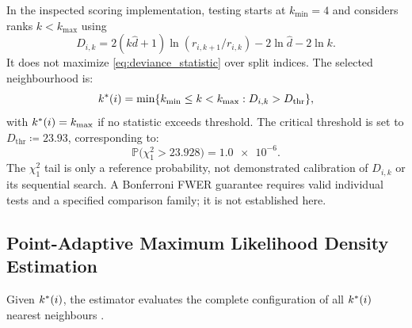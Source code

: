 \begin{definition}
  \label{def:kstar_stopping}
  In the inspected scoring implementation, testing starts at
  $k_{\min}=4$ and considers ranks $k<k_{\max}$ using
  \begin{equation}
    D_{i,k}=2(k\hat d+1)\ln(r_{i,k+1}/r_{i,k})
    -2\ln\hat d-2\ln k.
  \end{equation}
  It does not maximize \cref{eq:deviance_statistic} over split indices.
  The selected neighbourhood is:
  \begin{equation}
    k^{*}(i)=\min\{k_{\min}\le k<k_{\max}:D_{i,k}>D_{\mathrm{thr}}\},
    \label{eq:kstar_stopping_rule}
  \end{equation}
  with $k^{*}(i) = k_{\max}$ if no statistic exceeds threshold. The
  critical threshold is set to $D_{\mathrm{thr}} \coloneqq \num{23.93}$,
  corresponding to:
  \begin{equation}
    \mathbb{P}\bigl(\chi^2_1 > \num{23.928}\bigr) = \num{1.0e-6}.
    \label{eq:dthr_pvalue}
  \end{equation}
  The $\chi^2_1$ tail is only a reference probability, not demonstrated
  calibration of $D_{i,k}$ or its sequential search. A Bonferroni
  \ac{FWER} guarantee requires valid individual tests and a specified
  comparison family; it is not established here.
\end{definition}

\subsection{Point-Adaptive Maximum Likelihood Density Estimation}
\label{subsec:pak_density_estimation}

Given $k^{*}(i)$, the \pak{} estimator evaluates the complete
configuration of all $k^{*}(i)$ nearest neighbours \parencite{derrico2021}.

